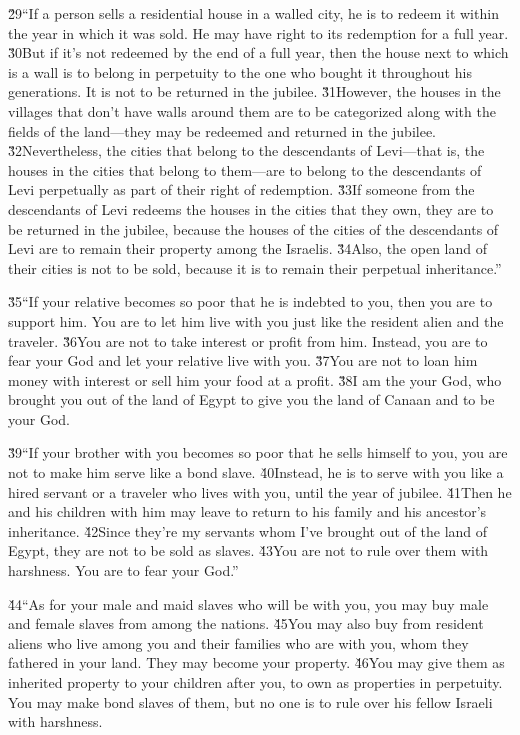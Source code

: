 \v{29}``If a person sells a residential house in a walled city, he is to redeem it within the year in which it was sold. He may have right to its redemption for a full year. \v{30}But if it's not redeemed by the end of a full year, then the house next to which is a wall is to belong in perpetuity to the one who bought it throughout his generations. It is not to be returned in the jubilee. \v{31}However, the houses in the villages that don't have walls around them are to be categorized along with the fields of the land---they may be redeemed and returned in the jubilee. \v{32}Nevertheless, the cities that belong to the descendants of Levi---that is, the houses in the cities that belong to them---are to belong to the descendants of Levi perpetually as part of their right of redemption. \v{33}If someone from the descendants of Levi redeems the houses in the cities that they own, they are to be returned in the jubilee, because the houses of the cities of the descendants of Levi are to remain their property among the Israelis. \v{34}Also, the open land of their cities is not to be sold, because it is to remain their perpetual inheritance.''

\v{35}``If your relative becomes so poor that he is indebted to you, then you are to support him. You are to let him live with you just like the resident alien and the traveler. \v{36}You are not to take interest or profit from him. Instead, you are to fear your God and let your relative live with you. \v{37}You are not to loan him money with interest or sell him your food at a profit. \v{38}I am the  your God, who brought you out of the land of Egypt to give you the land of Canaan and to be your God.

\v{39}``If your brother with you becomes so poor that he sells himself to you, you are not to make him serve like a bond slave. \v{40}Instead, he is to serve with you like a hired servant or a traveler who lives with you, until the year of jubilee. \v{41}Then he and his children with him may leave to return to his family and his ancestor's inheritance. \v{42}Since they're my servants whom I've brought out of the land of Egypt, they are not to be sold as slaves. \v{43}You are not to rule over them with harshness. You are to fear your God.''

\v{44}``As for your male and maid slaves who will be with you, you may buy male and female slaves from among the nations. \v{45}You may also buy from resident aliens who live among you and their families who are with you, whom they fathered in your land. They may become your property. \v{46}You may give them as inherited property to your children after you, to own as properties in perpetuity. You may make bond slaves of them, but no one is to rule over his fellow Israeli with harshness.

